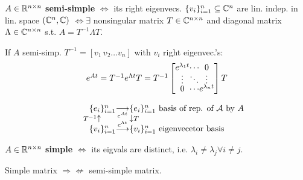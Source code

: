 \begin{Definition}
$A\in\mathbb R^{n\times n}$ \textbf{semi-simple} $\Leftrightarrow$ its right eigenvecs. $\{v_{i}\}_{i=1}^{n}\subseteq\mathbb C^n$ are lin. indep. in lin. space $(\mathbb C^n,\mathbb C)$ $\Leftrightarrow\exists$ nonsingular matrix $T\in\mathbb C^{n\times n}$ and diagonal matrix $\Lambda\in\mathbb C^{n\times n}$ s.t. $A=T^{-1}\Lambda T$.
\end{Definition}
\begin{Fact}
If $A$ semi-simp. $T^{-1}=[v_1\,v_2\ldots v_n]$ with $v_i$ right eigenvec.'s:
\begin{equation}\label{eq:eAt}
\begin{array}{r}
\e{At}=T^{-1}\e{\Lambda t}T=\inver{T}
\def\arraycolsep{0pt}
\begin{bmatrix}
\e{\lambda_1t} & \cdots & 0 \vspace{-1mm}\\
\vdots & \ddots & \vdots \vspace{-1mm}\\
0 & \cdots & e^{\lambda_n t}
\end{bmatrix}T
\end{array}
\end{equation}
\end{Fact}
\vspace{-2mm}
\begin{equation*}
\hspace{8mm}
\begin{array}{ccl}
\basis{e}{i}{n} & \underset{\mathclap{e^{At}}}{\longrightarrow} & \basis{e}{i}{n}\text{ basis of rep. of }\linA\text{ by }A \vspace{-2mm}\\
\begin{matrix}
\text{\hspace{-8mm}\footnotesize$T^{-1}$} & \uparrow & \text{}
\end{matrix} & & \begin{matrix}
\text{} & \downarrow & \text{\footnotesize$T$\hspace{-8mm}}
\end{matrix}\vspace{-1.5mm} \\
\basis{v}{i}{n} & \stackrel{\mathclap{e^{\Lambda t}}}{\longrightarrow} & \basis{v}{i}{n}\text{ eigenvecetor basis}
\end{array}
\end{equation*}
\begin{Definition}
$A\in\mathbb R^{n\times n}$ \textbf{simple} $\Leftrightarrow$ its eigvals are distinct, i.e. $\lambda_i\ne\lambda_j\forall i\ne j$.
\end{Definition}
\begin{Theorem}
Simple matrix $\Rightarrow\nLeftarrow$ semi-simple matrix.
\end{Theorem}

